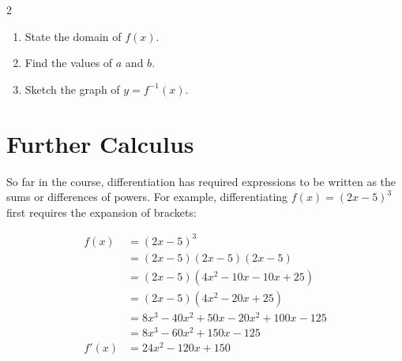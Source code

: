 \documentclass[
  11pt,
  openany]{book}
\begin{document}
\begin{enumerate}
\begin{multicols}{2}
\begin{center}
                \end{center}
                \columnbreak
                \begin{center}
                \begin{enumerate}
                    \item State the domain of $f(x)$.\\[2em]
                    \item Find the values of $a$ and $b$.\\[2em]
                    \item Sketch the graph of $y=f^{-1}(x)$.
                \end{enumerate}
                \end{center}
                \end{multicols}
\end{enumerate}

\pagebreak

\chapterfont{\color{white}}

\chapter{Further Calculus}\label{further-calculus}

\vspace{-12cm}
\begin{center}
\end{center}

So far in the course, differentiation has required expressions to be written as the sums or differences of powers. For example, differentiating \(f(x)=(2x-5)^3\) first requires the expansion of brackets:

\begin{align*}
    f(x)&=(2x-5)^3\\[0.5em]
    &=(2x-5)(2x-5)(2x-5)\\[0.5em]
    &=(2x-5)(4x^2-10x-10x+25)\\[0.5em]
    &=(2x-5)(4x^2-20x+25)\\[0.5em]
    &=8x^3-40x^2+50x-20x^2+100x-125\\[0.5em]
    &=8x^3-60x^2+150x-125\\[1em]
    f'(x)&=24x^2-120x+150
\end{align*}
\end{document}
